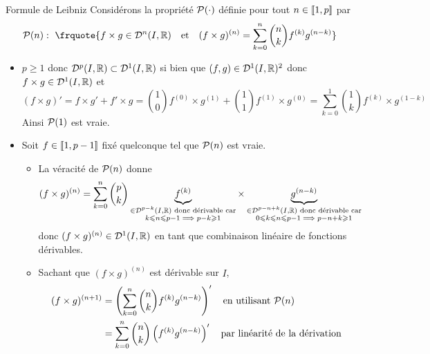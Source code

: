 \documentclass{article}
\date{24 Janvier 2024}
\begin{document}
\maketitle


\begin{question_kholle}{Formule de Leibniz}
	Considérons la propriété $\mathcal P(\cdot)$ définie pour tout $n\in[\![ 1,p ]\!]$ par
	\[
		\prop(n):~\frquote{f\times g \in \mathcal{D}^{n}(I,\R) \quad\text{et}\quad (f\times g)^{(n)}=\sum_{k=0}^{n}\binom{n}{k}f^{(k)}g^{(n-k)}}
	\]
	\begin{itemize}[label=$\vartriangleright$]
		\item $p\geq 1$ donc $\mathcal{D}^{p}(I,\mathbb R)\subset \mathcal{D}^{1}(I,\mathbb R)$ si bien que $(f,g)\in \mathcal{D}^{1}(I,\mathbb R)^{2}$ donc $f \times g \in \mathcal{D}^{1}(I,\mathbb R)$ et
		      \[
			      (f \times g)'=f \times g' + f' \times  g = \binom{1}{0}f^{(0)} \times g^{(1)} + \binom{1}{1}f^{(1)} \times g^{(0)} = \sum_{k=0}^{1}\binom{1}{k}f^{(k)} \times g^{(1-k)}
		      \]
		      Ainsi $\mathcal P(1)$ est vraie.
		\item Soit $f\in[\![ 1,p-1 ]\!]$ fixé quelconque tel que $\mathcal P(n)$ est vraie.
		      \begin{itemize}
			      \item La véracité de $\mathcal P(n)$ donne
			            \[
				            (f \times g)^{(n)} = \sum_{k=0}^{n}\binom{p}{k}\underbrace{f^{(k)}}_{\substack{\in \mathcal{D}^{p-k}(I,\mathbb R) \text{ donc dérivable car}\\k\leqslant n\leqslant p-1 \implies p-k\geqslant 1}} \times \underbrace{g^{(n-k)}}_{\substack{\in \mathcal{D}^{p-n+k}(I,\mathbb R) \text{ donc dérivable car}\\0\leqslant k\leqslant n\leqslant p-1 \implies p-n+k\geqslant 1}}
			            \]
			            donc $(f \times g)^{(n)}\in \mathcal{D}^{1}(I,\mathbb R)$ en tant que combinaison linéaire de fonctions dérivables.
			      \item Sachant que $(f \times g)^{(n)}$ est dérivable sur $I$,
			            \begin{align*}
				            (f \times g)^{(n+1)} & = \left(\sum_{k=0}^{n}\binom{n}{k}f^{(k)}g^{(n-k)}\right)' \quad\text{en utilisant } \prop(n)                                                                     \\
				                                 & = \sum_{k=0}^{n}\binom{n}{k}\left(f^{(k)}g^{(n-k)}\right)' \quad\text{par linéarité de la dérivation}                                                             \\

\end{align*}
\end{itemize}
\end{itemize}
\end{question_kholle}
\end{document}
